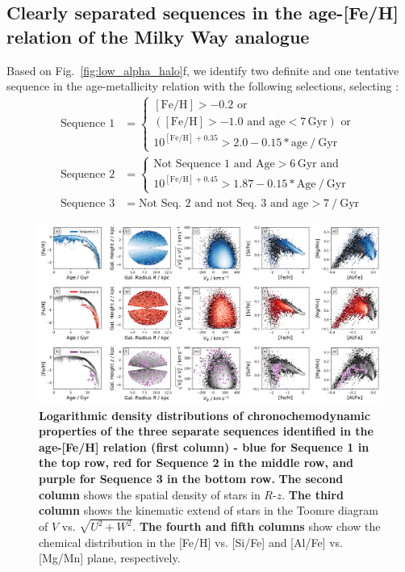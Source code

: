 \documentclass[fleqn,usenatbib]{mnras}
\begin{document}
\subsection{Clearly separated sequences in the age-[Fe/H] relation of the Milky Way analogue} \label{sec:age-feh-sequences}

Based on Fig.~\ref{fig:low_alpha_halo}f, we identify two definite and one tentative sequence in the age-metallicity relation with the following selections, selecting :
\begin{align}
    \text{Sequence~1} &= \begin{cases}
        \mathrm{[Fe/H] > -0.2} \text{ or} \\
        (\mathrm{[Fe/H]} > -1.0 \text{ and } \mathrm{age} < 7\,\mathrm{Gyr}) \text{ or} \\
        10^{\mathrm{[Fe/H]} + 0.35} > 2.0 - 0.15*\mathrm{age}~/~\mathrm{Gyr}
    \end{cases} \label{eq:sequence1} \\
    \text{Sequence~2} &= \begin{cases}
        \text{Not Sequence~1 and }\mathrm{Age} > 6\,\mathrm{Gyr} \text{ and} \\
        10^{\mathrm{[Fe/H]} + 0.45} > 1.87 - 0.15*\mathrm{Age}~/~\mathrm{Gyr}
    \end{cases}  \label{eq:sequence2} \\
    \text{Sequence~3} &= \text{Not Seq.~2 and not Seq.~3 and } \mathrm{age} > 7~/~\mathrm{Gyr}  \label{eq:sequence3}
\end{align}

\begin{figure}
	\includegraphics[width=\textwidth]{figures/three_sequences_traced.png}
    \caption{
    \textbf{Logarithmic density distributions of chronochemodynamic properties of the three separate sequences identified in the age-[Fe/H] relation (first column) - blue for Sequence 1 in the top row, red for Sequence 2 in the middle row, and purple for Sequence 3 in the bottom row.
    }
    \textbf{The second column} shows the spatial density of stars in $R$-$z$.
    \textbf{The third column} shows the kinematic extend of stars in the Toomre diagram of $V$ vs. $\sqrt{U^2+W^2}$.
    \textbf{The fourth and fifth columns} show chow the chemical distribution in the [Fe/H] vs. [Si/Fe] and [Al/Fe] vs. [Mg/Mn] plane, respectively.
    }
    \label{fig:three_sequences_traced}
\end{figure}
\end{document}
